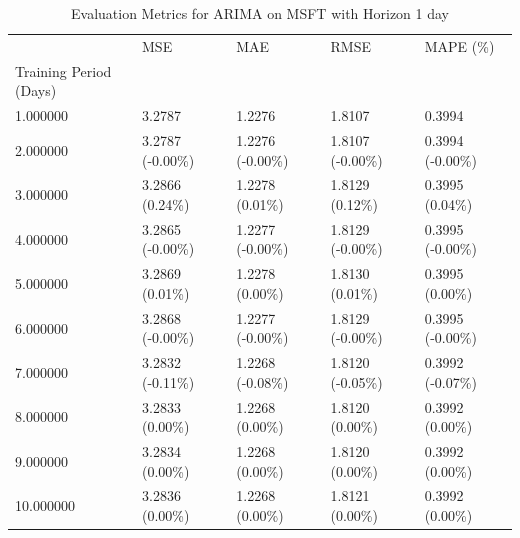 \begin{table}
\caption{Evaluation Metrics for ARIMA on MSFT with Horizon 1 day}
\label{tab:arima_MSFT_h1_metrics}
\begin{tabular}{lllll}
\toprule
 & MSE & MAE & RMSE & MAPE (\%) \\
Training Period (Days) &  &  &  &  \\
\midrule
1.000000 & 3.2787 & 1.2276 & 1.8107 & 0.3994 \\
2.000000 & 3.2787 (-0.00\%) & 1.2276 (-0.00\%) & 1.8107 (-0.00\%) & 0.3994 (-0.00\%) \\
3.000000 & 3.2866 (0.24\%) & 1.2278 (0.01\%) & 1.8129 (0.12\%) & 0.3995 (0.04\%) \\
4.000000 & 3.2865 (-0.00\%) & 1.2277 (-0.00\%) & 1.8129 (-0.00\%) & 0.3995 (-0.00\%) \\
5.000000 & 3.2869 (0.01\%) & 1.2278 (0.00\%) & 1.8130 (0.01\%) & 0.3995 (0.00\%) \\
6.000000 & 3.2868 (-0.00\%) & 1.2277 (-0.00\%) & 1.8129 (-0.00\%) & 0.3995 (-0.00\%) \\
7.000000 & 3.2832 (-0.11\%) & 1.2268 (-0.08\%) & 1.8120 (-0.05\%) & 0.3992 (-0.07\%) \\
8.000000 & 3.2833 (0.00\%) & 1.2268 (0.00\%) & 1.8120 (0.00\%) & 0.3992 (0.00\%) \\
9.000000 & 3.2834 (0.00\%) & 1.2268 (0.00\%) & 1.8120 (0.00\%) & 0.3992 (0.00\%) \\
10.000000 & 3.2836 (0.00\%) & 1.2268 (0.00\%) & 1.8121 (0.00\%) & 0.3992 (0.00\%) \\
\bottomrule
\end{tabular}
\end{table}
